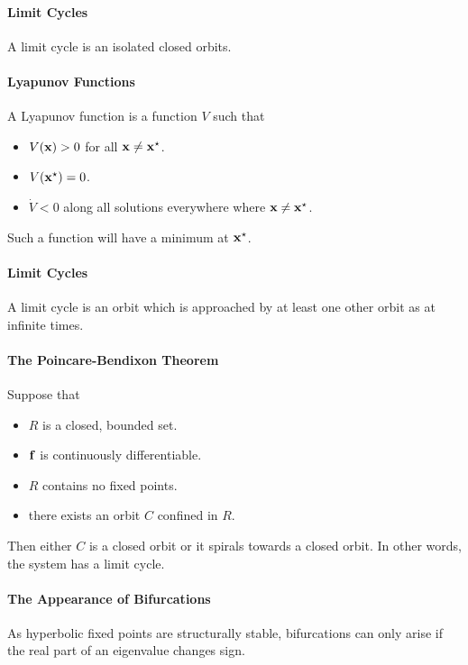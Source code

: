 \paragraph{Limit Cycles}
A limit cycle is an isolated closed orbits.

\paragraph{Lyapunov Functions}
A Lyapunov function is a function $V$ such that
\begin{itemize}
	\item $V(\vb{x}) > 0$ for all $\vb{x} \neq \vb{x}^{\star}$.
	\item $V(\vb{x}^{\star}) = 0$.
	\item $\dot{V} < 0$ along all solutions everywhere where $\vb{x} \neq \vb{x}^{\star}$.
\end{itemize}
Such a function will have a minimum at $\vb{x}^{\star}$.

\paragraph{Limit Cycles}
A limit cycle is an orbit which is approached by at least one other orbit as at infinite times.

\paragraph{The Poincare-Bendixon Theorem}
Suppose that
\begin{itemize}
	\item $R$ is a closed, bounded set.
	\item $\vb{f}$ is continuously differentiable.
	\item $R$ contains no fixed points.
	\item there exists an orbit $C$ confined in $R$.
\end{itemize}
Then either $C$ is a closed orbit or it spirals towards a closed orbit. In other words, the system has a limit cycle.

\paragraph{The Appearance of Bifurcations}
As hyperbolic fixed points are structurally stable, bifurcations can only arise if the real part of an eigenvalue changes sign.

